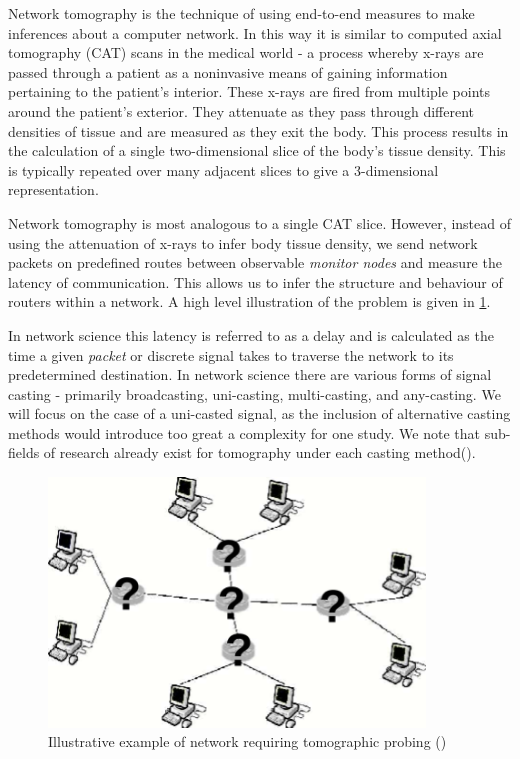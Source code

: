 Network tomography is the technique of using end-to-end measures to make inferences about a computer network. In this way it is similar to computed axial tomography (CAT) scans in the medical world - a process whereby x-rays are passed through a patient as a noninvasive means of gaining information pertaining to the patient's interior. These x-rays are fired from multiple points around the patient's exterior. They attenuate as they pass through different densities of tissue and are measured as they exit the body. This process results in the calculation of a single two-dimensional slice of the body's tissue density. This is typically repeated over many adjacent slices to give a 3-dimensional representation.\par
Network tomography is most analogous to a single CAT slice. However, instead of using the attenuation of x-rays to infer body tissue density, we send network packets on predefined routes between observable \textit{monitor nodes} and measure the latency of communication. This allows us to infer the structure and behaviour of routers within a network. A high level illustration of the problem is given in \ref{fig:nettom?}.\par
In network science this latency is referred to as a delay and is calculated as the time a given \textit{packet} or discrete signal takes to traverse the network to its predetermined destination. In network science there are various forms of signal casting - primarily broadcasting, uni-casting, multi-casting, and any-casting. We will focus on the case of a uni-casted signal, as the inclusion of alternative casting methods would introduce too great a complexity for one study. We note that sub-fields of research already exist for tomography under each casting method(\cite{lawrence_network_2006}).\par
\begin{figure}
    \centering
    \includegraphics[width=10cm]{figs/intro/nettom-illustration.png}
    \caption[Illustrative example of network requiring tomographic probing]{Illustrative example of network requiring tomographic probing (\cite{lawrence_network_2006})}
    \label{fig:nettom?}
\end{figure}

